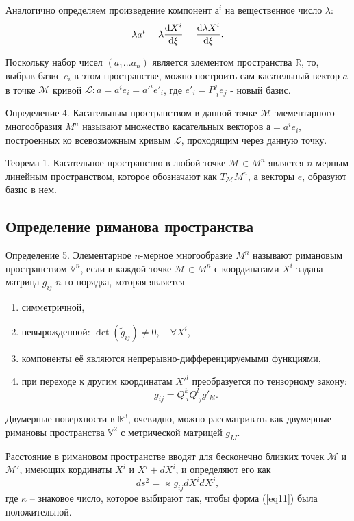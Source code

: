 \documentclass[14pt,a4paper]{extarticle}
\begin{document}
Аналогично определяем произведение компонент $а^i$ на вещественное число $\lambda$:
\begin{equation}\label{eq9}
	\lambda a^i = \lambda \dv{X^i}{\xi} = \dv{\lambda X^i}{\xi}.
\end{equation}

Поскольку набор чисел $(a_1 ...a_n)$ является элементом пространства $\mathbb{R}$, то, выбрав базис $e_i$ в этом пространстве, можно построить сам касательный вектор $a$ в точке $\mathcal{M}$ кривой $\mathcal{L}: a = a^ie_i = a'^ie'_i$, где $e'_i = P_{\; i}^j e_j$ - новый базис.


Определение 4. Касательным пространством в данной точке $\mathcal{M}$ элементарного многообразия $M^n$ называют множество касательных векторов $а = a^ie_i$, построенных ко всевозможным кривым $\mathcal{L}$, проходящим через данную точку.


Теорема 1. Касательное пространство в любой точке $\mathcal{M} \in M^n$ является $n$-мерным линейным пространством, которое обозначают как $T_{\mathcal{M}}M^n$, а векторы $e$, образуют базис в нем.


\subsection{Определение риманова пространства}
Определение 5. Элементарное $n$-мерное многообразие $M^n$ называют римановым пространством $\mathbb{V}^n$, если в каждой точке $\mathcal{M} \in M^n$ с координатами $X^i$ задана матрица $g_{ij}$ $n$-го порядка, которая является

\begin{enumerate}
	\item симметричной,
	\item невырожденной: $\det (\tilde{g}_{ij}) \neq 0, \quad \forall X^i$,
	\item компоненты её являются непрерывно-дифференцируемыми функциями,
	\item при переходе к другим координатам $X'^l$ преобразуется по тензорному закону:
	\begin{equation}\label{eq10}
		g_{ij} = Q_{\; i}^k Q_{\; j}^l g'_{kl}.
	\end{equation}
\end{enumerate}


Двумерные поверхности в $\mathbb{R}^3$, очевидно, можно рассматривать как двумерные римановы пространства $\mathbb{V}^2$ с метрической матрицей $\tilde{g}_{IJ}$.

Расстояние в римановом пространстве вводят для бесконечно близких точек $\mathcal{M}$ и $\mathcal{M'}$, имеющих кординаты $X^i$ и $X^i + dX^i$, и определяют его как
\begin{equation}\label{eq11}
	ds^2 = \varkappa g_{ij} dX^idX^j,
\end{equation}
где $\kappa$ -- знаковое число, которое выбирают так, чтобы форма (\ref{eq11}) была положительной.
\end{document}
